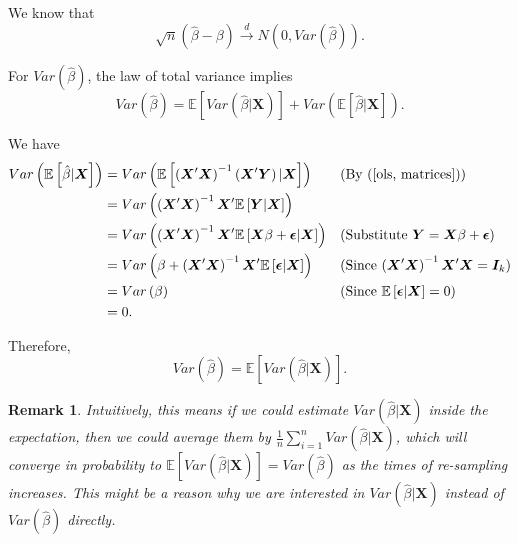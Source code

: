 \documentclass[11pt,a4paper]{amsart}
\theoremstyle{plain}
\newtheorem*{remark*}{Remark}
\theoremstyle{definition}
\begin{document}
	 We know that 
	 \[	\sqrt{n}(\hat{\beta} - \beta) \stackrel{d}{\longrightarrow} N(0,Var(\hat{\beta})).	\]
	 
	 For $Var(\hat{\beta})$, the law of total variance implies
	 \[	 Var(\hat{\beta}) = \mathbb{E}\left[Var(\hat{\beta} | \bm{X})\right] + Var\left(\mathbb{E}\left[\hat{\beta} | \bm{X}\right]\right).	\]
	 
	 We have 
	 \[	\begin{aligned}
		 Var\left(\mathbb{E}\left[\hat{\beta} | \bm{X}\right]\right) &= Var\left(\mathbb{E}\left[\left(\bm{X}'\bm{X}\right)^{-1}\left(\bm{X}' \bm{Y}\right) | \bm{X}\right]\right) &&\text{(By (\ref{ols, matrices}))}\\
		 &= Var\left(\left(\bm{X}'\bm{X}\right)^{-1} \bm{X}' \mathbb{E}\left[ \bm{Y} | \bm{X}\right]\right) \\
		 &= Var\left(\left(\bm{X}'\bm{X}\right)^{-1} \bm{X}' \mathbb{E}\left[ \bm{X}\beta + \bm{\epsilon} | \bm{X}\right]\right) &&\text{(Substitute $\bm{Y} = \bm{X}\beta + \bm{\epsilon}$)}\\
		 &= Var\left(\beta +\left(\bm{X}'\bm{X}\right)^{-1} \bm{X}' \mathbb{E}\left[ \bm{\epsilon} | \bm{X}\right]\right) &&\text{(Since $\left(\bm{X}'\bm{X}\right)^{-1}\bm{X}'\bm{X} = \bm{I}_{k}$)}\\
		 &= Var\left(\beta\right) &&\text{(Since $ \mathbb{E}\left[ \bm{\epsilon} | \bm{X}\right]=0$)}\\
		 &= 0.
	 \end{aligned}	\]
	 
	 Therefore, 
	  \[	 Var(\hat{\beta}) = \mathbb{E}\left[Var(\hat{\beta} | \bm{X})\right].	\]
	  
	\begin{remark*}
		Intuitively, this means if we could estimate $Var(\hat{\beta} | \bm{X})$ inside the expectation, then we could average them by $\frac{1}{n} \sum_{i=1}^{n} Var(\hat{\beta} | \bm{X})$, which will converge in probability to $ \mathbb{E}\left[Var(\hat{\beta} | \bm{X})\right] =  Var(\hat{\beta})$ as the times of re-sampling increases. This might be a reason why we are interested in $Var(\hat{\beta} | \bm{X})$ instead of $Var(\hat{\beta})$ directly.
	\end{remark*}
\end{document}
